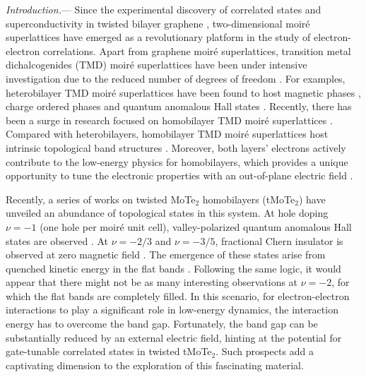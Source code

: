 \documentclass[twocolumn,aps,prl,superscriptaddress]{revtex4-2}
\begin{document}
\textit{Introduction.}---
Since the experimental discovery of correlated states and superconductivity in twisted bilayer graphene \cite{cao2018unconventional,cao2018correlated}, two-dimensional moir\'e superlattices have emerged as a revolutionary platform in the study of electron-electron correlations. Apart from graphene moir\'e superlattices, transition metal dichalcogenides (TMD) moir\'e superlattices have been under intensive investigation due to the reduced number of degrees of freedom \cite{wu2018hubbard,wu2019topological}. For examples, heterobilayer TMD moir\'e superlattices have been found to host magnetic phases \cite{regan2020mott,tang2020simulation,zhao2023gate,li2021continuous}, charge ordered phases \cite{regan2020mott,xu2020correlated,huang2021correlated,li2021imaging} and quantum anomalous Hall states \cite{li2021quantum,tao2022valley,zhao2022realization,zhang2021spin,devakul2021magic,pan2022topological,xie2022valley}. Recently, there has been a surge in research focused on homobilayer TMD moir\'e superlattices \cite{pan2020band,angeli2021gamma,xian2021realization,anderson2023programming,cai2023signatures,foutty2023mapping}. Compared with heterobilayers, homobilayer TMD moir\'e superlattices host intrinsic topological band structures \cite{wu2019topological,yu2020giant}. Moreover, both layers' electrons actively contribute to the low-energy physics for homobilayers, which provides a unique opportunity to tune the electronic properties with an out-of-plane electric field \cite{haavisto2022topological,anderson2023programming}.

Recently, a series of works on twisted MoTe$_2$ homobilayers (tMoTe$_2$) have unveiled an abundance of topological states in this system. At hole doping $\nu = -1$ (one hole per moir\'e unit cell), valley-polarized quantum anomalous Hall states are observed \cite{cai2023signatures,zeng2023integer,park2023observation}. At $\nu = -2/3$ and $\nu = -3/5$, fractional Chern insulator is observed at zero magnetic field \cite{cai2023signatures,zeng2023integer,park2023observation}. The emergence of these states arise from quenched kinetic energy in the flat bands \cite{li2021spontaneous,wang2023fractional,reddy2023fractional}. Following the same logic, it would appear that there might not be as many interesting observations at $\nu = -2$, for which the flat bands are completely filled. In this scenario, for electron-electron interactions to play a significant role in low-energy dynamics, the interaction energy has to overcome the band gap. Fortunately, the band gap can be substantially reduced by an external electric field, hinting at the potential for gate-tunable correlated states in twisted tMoTe$_2$. Such prospects add a captivating dimension to the exploration of this fascinating material.
\end{document}

